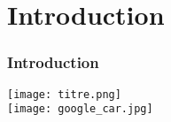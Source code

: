 \section{Introduction}
\begin{frame}
    \frametitle{Introduction}

    \begin{center}
        \texttt{[image: titre.png]} \\
        \texttt{[image: google\_car.jpg]}
    \end{center}
\end{frame}
